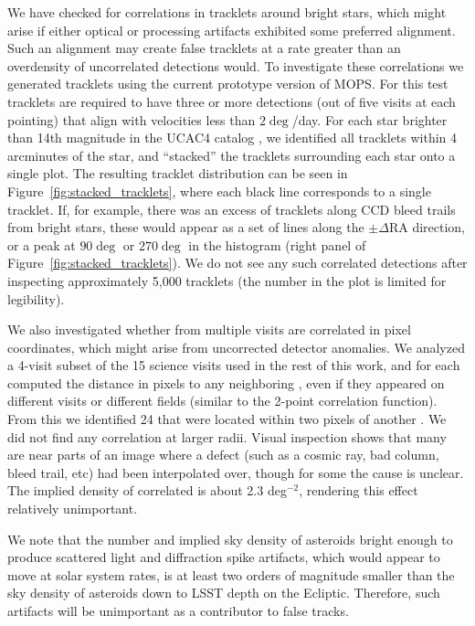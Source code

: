 We have checked for correlations in tracklets around bright stars, which
might arise if either optical or processing artifacts exhibited some preferred
alignment. Such an alignment may create false tracklets at a rate greater than
an overdensity of uncorrelated detections would. To investigate these
correlations we generated tracklets using the current prototype version of MOPS.
For this test tracklets are required to have three or more detections (out of five visits
at each pointing) that align with velocities less than $2\deg$/day. For each
star brighter than 14th magnitude in the UCAC4 catalog \citep{UCAC4}, we
identified all tracklets within 4 arcminutes of the star, and ``stacked'' the
tracklets surrounding each star onto a single plot. The resulting tracklet
distribution can be seen in Figure~\ref{fig:stacked_tracklets}, where each black
line corresponds to a single tracklet. If, for example, there was an excess of
tracklets along CCD bleed trails from bright stars, these would appear as a set
of lines along the $\pm\Delta \textrm{RA}$ direction, or a peak at $90\deg$ or
$270\deg$ in the histogram (right panel of Figure~\ref{fig:stacked_tracklets}).
We do not see any such correlated detections after inspecting approximately
5,000 tracklets (the number in the plot is limited for legibility).

We also investigated whether \DIASources from multiple visits are correlated
in pixel coordinates, which might arise from uncorrected detector anomalies.
We analyzed a 4-visit subset of the 15 science visits used in the rest of this
work, and for each \DIASource computed the distance in pixels to any neighboring
\DIASources, even if they appeared on different visits or different fields
(similar to the 2-point correlation function). From this we identified  24
\DIASources that were located within two pixels of another \DIASource. We did
not find any correlation at larger radii. Visual inspection shows that many are
near parts of an image where a defect (such as a cosmic ray, bad column, bleed
trail, etc) had been interpolated over, though for some the cause is unclear.
The implied density of correlated \DIASources is about 2.3 deg$^{-2}$, rendering
this effect relatively unimportant.

We note that the number and implied sky density of asteroids bright enough to produce
scattered light and diffraction spike artifacts, which would appear to move at solar system
rates, is at least two orders of magnitude smaller than the sky density of asteroids down
to LSST depth on the Ecliptic. Therefore, such artifacts will be unimportant as a contributor
to false tracks.
